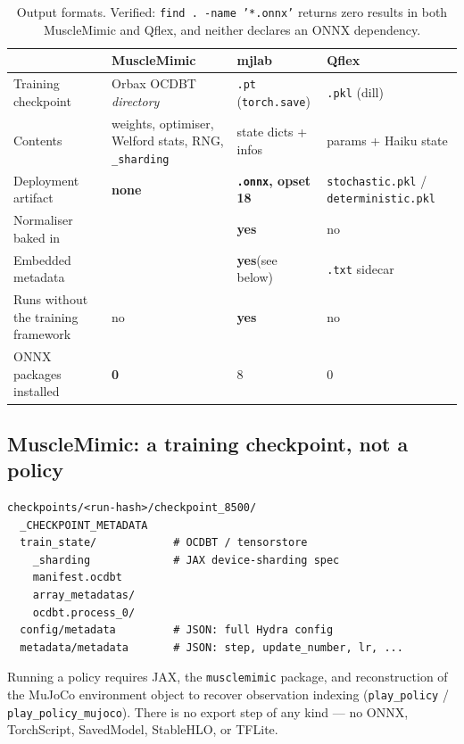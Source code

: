\documentclass[11pt,a4paper]{article}
\newcommand{\yes}{\textbf{yes}}
\newcommand{\no}{no}
\newcommand{\na}{\textemdash}
\begin{document}
\begin{table}[h!]
\centering
\footnotesize
\begin{tabular}{@{}lL{3.1cm}L{3.3cm}L{3.3cm}@{}}
\toprule
 & \textcolor{mmC}{MuscleMimic} & \textcolor{mjC}{mjlab} & \textcolor{qfC}{Qflex} \\
\midrule
Training checkpoint & Orbax OCDBT \emph{directory} & \texttt{.pt} (\texttt{torch.save}) & \texttt{.pkl} (dill) \\
Contents & weights, optimiser, Welford stats, RNG, \texttt{\_sharding} & state dicts + infos & params + Haiku state \\
Deployment artifact & \textbf{none} & \textbf{\texttt{.onnx}, opset 18} & \texttt{stochastic.pkl} / \texttt{deterministic.pkl} \\
Normaliser baked in & \na & \yes & \no \\
Embedded metadata & \na & \yes (see below) & \texttt{.txt} sidecar \\
Runs without the training framework & \no & \yes & \no \\
ONNX packages installed & \textbf{0} & 8 & 0 \\
\bottomrule
\end{tabular}
\caption{Output formats. Verified: \texttt{find . -name '*.onnx'} returns zero results in
both MuscleMimic and Qflex, and neither declares an ONNX dependency.}
\end{table}

\subsection{MuscleMimic: a training checkpoint, not a policy}

\begin{lstlisting}
checkpoints/<run-hash>/checkpoint_8500/
  _CHECKPOINT_METADATA
  train_state/            # OCDBT / tensorstore
    _sharding             # JAX device-sharding spec
    manifest.ocdbt
    array_metadatas/
    ocdbt.process_0/
  config/metadata         # JSON: full Hydra config
  metadata/metadata       # JSON: step, update_number, lr, ...
\end{lstlisting}

\noindent
Running a policy requires JAX, the \texttt{musclemimic} package, and reconstruction of the
MuJoCo environment object to recover observation indexing
(\texttt{play\_policy} / \texttt{play\_policy\_mujoco}). There is no export step of any
kind --- no ONNX, TorchScript, SavedModel, StableHLO, or TFLite.
\end{document}
